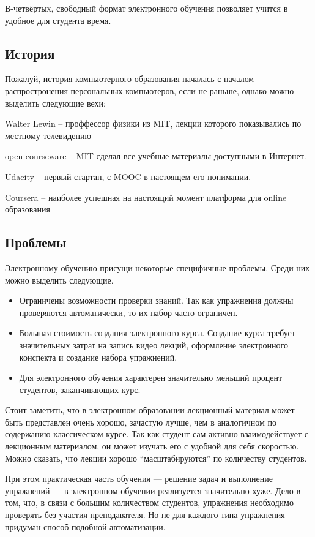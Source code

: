 \documentclass{matmex-diploma-custom}
\begin{document}
В-четвёртых, свободный формат электронного обучения позволяет учится в
удобное для студента время.

\subsection*{История}
Пожалуй, история компьютерного образования началась с началом
распростронения персональных компьютеров, если не раньше, однако можно
выделить следующие вехи:

Walter Lewin -- проффессор физики из MIT, лекции которого показывались
по местному телевидению

open courseware -- MIT сделал все учебные материалы доступными в Интернет.

Udacity -- первый стартап, с MOOC в настоящем его понимании.

Coursera -- наиболее успешная на настоящий момент платформа для online
образования

\subsection*{Проблемы}
Электронному обучению присущи некоторые специфичные проблемы. Среди них
можно выделить следующие.
\begin{itemize}
\item Ограничены возможности проверки знаний. Так как упражнения
  должны проверяются автоматически, то их набор часто ограничен.
\item Большая стоимость создания электронного курса. Создание курса требует
  значительных затрат на запись видео лекций, оформление электронного
  конспекта и создание набора упражнений.
\item Для электронного обучения характерен значительно
  меньший процент студентов, заканчивающих курс.
\end{itemize}

Стоит заметить, что в электронном образовании лекционный материал
может быть представлен очень хорошо, зачастую лучше, чем в аналогичном
по содержанию классическом курсе. Так как студент сам активно
взаимодействует с лекционным материалом, он может изучать его с
удобной для себя скоростью. Можно сказать, что лекции хорошо
``масштабируются'' по количеству студентов.

При этом практическая часть обучения --- решение задач и выполнение
упражнений --- в электронном обучении реализуется значительно хуже.
Дело в том, что, в связи с большим количеством студентов, упражнения
необходимо проверять без участия преподавателя. Но не для каждого типа
упражнения придуман способ подобной автоматизации.
\end{document}
